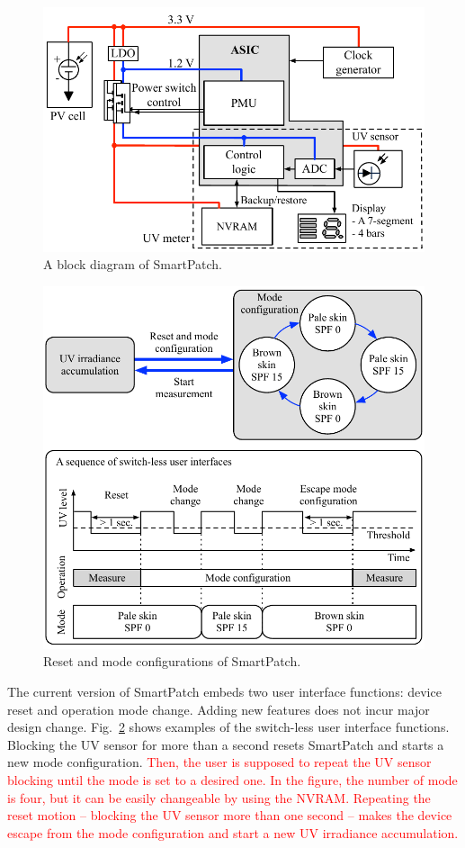 \documentclass[journal]{IEEEtran}
\begin{document}
\begin{figure}
\centering
\includegraphics[width=1.0\hsize]{Figures/block_diagram.pdf}
\caption{A block diagram of SmartPatch.}
\label{fig:block_diagram}
\end{figure}

\begin{figure}
\centering
\includegraphics[width=1.0\hsize]{Figures/configuration.pdf}
\caption{Reset and mode configurations of SmartPatch.}
\label{fig:configuration}
\end{figure}

The current version of SmartPatch embeds two user interface functions: device reset and operation mode change.
Adding new features does not incur major design change.
Fig.~\ref{fig:configuration} shows examples of the switch-less user interface functions.
Blocking the UV sensor for more than a second resets SmartPatch and starts a new mode configuration.
\textcolor{red}{Then, the user is supposed to repeat the UV sensor blocking until the mode is set to a desired one. In the figure, the number of mode is four, but it can be easily changeable by using the NVRAM.
Repeating the reset motion -- blocking the UV sensor more than one second -- makes the device escape from the mode configuration and start a new UV irradiance accumulation.}
\end{document}
